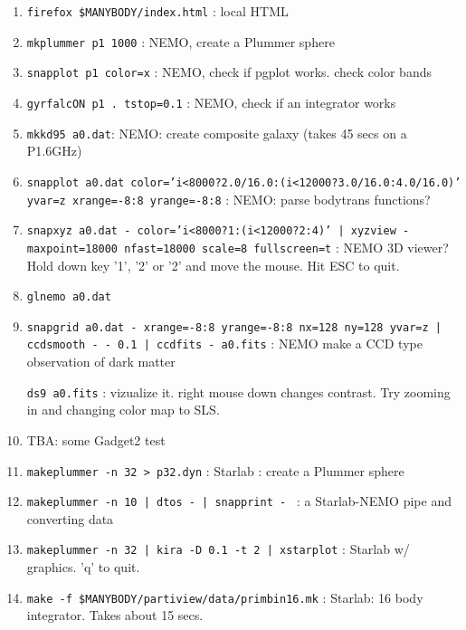 \begin{enumerate}

\item
{\tt firefox \$MANYBODY/index.html} : local HTML 

\item
{\tt mkplummer p1 1000} : NEMO, create a Plummer sphere

\item
{\tt snapplot p1 color=x} : NEMO, check if pgplot works. check color bands 

\item
{\tt gyrfalcON p1 . tstop=0.1} : NEMO, check if an integrator works

\item
{\tt mkkd95 a0.dat}: NEMO: create composite galaxy (takes 45 secs on a P1.6GHz)

\item
{\tt snapplot a0.dat color='i<8000?2.0/16.0:(i<12000?3.0/16.0:4.0/16.0)' yvar=z xrange=-8:8 yrange=-8:8} :
NEMO: parse bodytrans functions?

\item
{\tt snapxyz a0.dat - color='i<8000?1:(i<12000?2:4)' | xyzview - maxpoint=18000 nfast=18000 scale=8 fullscreen=t} : 
NEMO 3D viewer? Hold down key '1', '2' or '2' and move the mouse. Hit ESC to quit.

\item 
{\tt glnemo a0.dat}

\item 
{\tt snapgrid a0.dat - xrange=-8:8 yrange=-8:8 nx=128 ny=128 yvar=z | ccdsmooth - - 0.1 | ccdfits - a0.fits} :
NEMO make a CCD type observation of dark matter

{\tt ds9 a0.fits} : vizualize it. right mouse down changes contrast. Try zooming in and changing color map to SLS.

\item
TBA: some Gadget2 test

\item
{\tt makeplummer -n 32 > p32.dyn} : Starlab : create a Plummer sphere


\item
{\tt makeplummer -n 10 | dtos - | snapprint - } : a Starlab-NEMO pipe and converting data

\item
{\tt makeplummer -n 32 | kira -D 0.1 -t 2 | xstarplot} : Starlab w/ graphics. 'q' to quit.

\item
{\tt make -f \$MANYBODY/partiview/data/primbin16.mk} : Starlab: 16 body integrator. Takes about 15 secs.


\end{enumerate}

